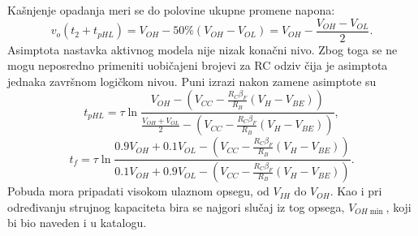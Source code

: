 Kašnjenje opadanja meri se do polovine ukupne promene napona:
\[v_o(t_2+t_{pHL})=V_{OH}-50\%(V_{OH}-V_{OL})=V_{OH}-\frac{V_{OH}-V_{OL}}2.\]
Asimptota nastavka aktivnog modela nije nizak konačni nivo. Zbog toga se ne mogu neposredno primeniti uobičajeni brojevi za RC odziv čija je asimptota jednaka završnom logičkom nivou. Puni izrazi nakon zamene asimptote su
\[t_{pHL}=\tau\ln\frac{V_{OH}-(V_{CC}-\frac{R_C\beta_F}{R_B}(V_H-V_{BE}))}{\frac{V_{OH}+V_{OL}}2-(V_{CC}-\frac{R_C\beta_F}{R_B}(V_H-V_{BE}))},\]
\[t_f=\tau\ln\frac{0.9V_{OH}+0.1V_{OL}-(V_{CC}-\frac{R_C\beta_F}{R_B}(V_H-V_{BE}))}{0.1V_{OH}+0.9V_{OL}-(V_{CC}-\frac{R_C\beta_F}{R_B}(V_H-V_{BE}))}.\]
Pobuda mora pripadati visokom ulaznom opsegu, od $V_{IH}$ do $V_{OH}$. Kao i pri određivanju strujnog kapaciteta bira se najgori slučaj iz tog opsega, $V_{OH\min}$, koji bi bio naveden i u katalogu.
